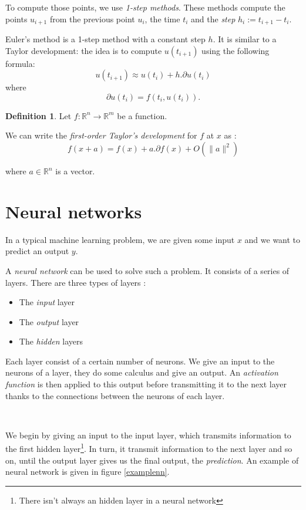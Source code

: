 \documentclass[10pt,a4paper]{article}
\theoremstyle{definition}
\newtheorem{definition}{Definition}
\theoremstyle{definition}
\theoremstyle{definition}
\begin{document}
To compute those points, we use \textit{1-step methods}. These methods compute the points $u_{i+1}$ from the previous point $u_i$, the time $t_i$ and the \textit{step} $h_i := t_{i+1} - t_i$.

Euler's method is a 1-step method with a constant step $h$. It is similar to a Taylor development: the idea is to compute $u(t_{i+1})$ using the following formula:
$$
u(t_{i+1}) \approx u(t_i) + h . \partial u(t_i)
$$
where 
$$
\partial u(t_i) = f(t_i, u(t_i)).
$$

\begin{definition}
Let $f: \mathbb{R}^n \rightarrow \mathbb{R}^m$ be a function.

We can write the \textit{first-order Taylor's development} for $f$ at $x$ as :
$$
f(x + a) = f(x) + a . \partial f(x) + O(\| a\|^2)
$$

where $a \in \mathbb{R}^n$ is a vector.
\end{definition}

\section{Neural networks}

In a typical machine learning problem, we are given some input $x$ and we want to predict an output $y$. 

\noindent A \textit{neural network} can be used to solve such a problem. It consists of a series of layers. There are three types of layers :

\begin{itemize}
\item The \textit{input} layer
\item The \textit{output} layer
\item The \textit{hidden} layers
\end{itemize}

Each layer consist of a certain number of neurons. We give an input to the neurons of a layer, they do some calculus and give an output. An \textit{activation function} is then applied to this output before transmitting it to the next layer thanks to the connections between the neurons of each layer.

~

We begin by giving an input to the input layer, which transmits information to the first hidden layer\footnote{There isn't always an hidden layer in a neural network}. In turn, it transmit information to the next layer and so on, until the output layer gives us the final output, the \textit{prediction}. An example of neural network is given in figure \ref{examplenn}.
\end{document}
